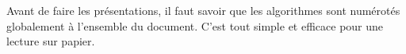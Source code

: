 Avant de faire les présentations, il faut savoir que les algorithmes sont numérotés globalement à l'ensemble du document. C'est tout simple et efficace pour une lecture sur papier.